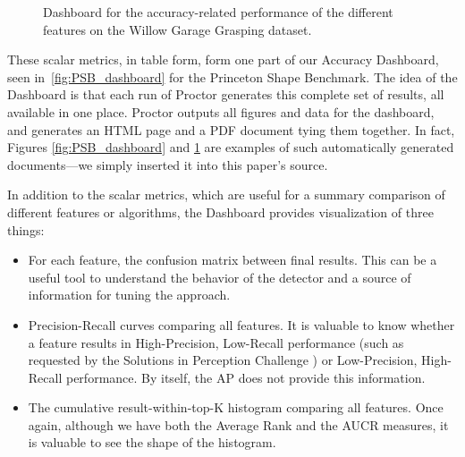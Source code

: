 \begin{figure}[thpb]
   \hfill
  \caption{Dashboard for the accuracy-related performance of the different features on the Willow Garage Grasping dataset.}
  \label{fig:WGDB_dashboard}
\end{figure}

These scalar metrics, in table form, form one part of our Accuracy Dashboard, seen in~\autoref{fig:PSB_dashboard} for the Princeton Shape Benchmark.
The idea of the Dashboard is that each run of Proctor generates this complete set of results, all available in one place.
Proctor outputs all figures and data for the dashboard, and generates an HTML page and a PDF document tying them together.
In fact, Figures \ref{fig:PSB_dashboard} and \ref{fig:WGDB_dashboard} are examples of such
automatically generated documents---we simply inserted it into this
paper's source.

In addition to the scalar metrics, which are useful for a summary comparison of different features or algorithms, the Dashboard provides visualization of three things:
\begin{itemize}
  \item For each feature, the confusion matrix between final results. This can be a useful tool to understand the behavior of the detector and a source of information for tuning the approach.
  \item Precision-Recall curves comparing all features. It is valuable to know whether a feature results in High-Precision, Low-Recall performance (such as requested by the Solutions in Perception Challenge \cite{SIPC2011}) or Low-Precision, High-Recall performance. By itself, the AP does not provide this information.
  \item The cumulative result-within-top-K histogram comparing all features. Once again, although we have both the Average Rank and the AUCR measures, it is valuable to see the shape of the histogram.
\end{itemize}

